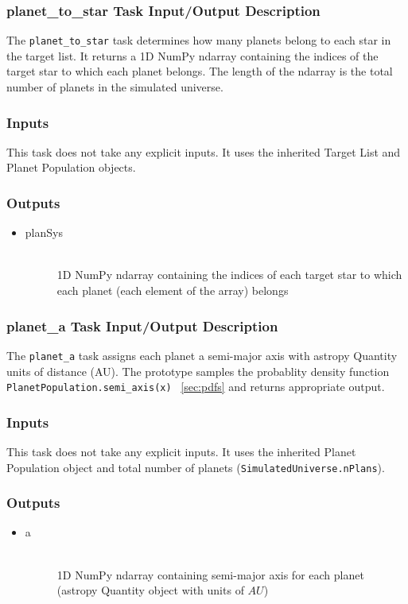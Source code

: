 \documentclass[cleanfoot]{asme2ej}
\begin{document}
\subsubsection{planet\_to\_star Task Input/Output Description} \label{sec:planettostartask}
The \verb+planet_to_star+ task determines how many planets belong to each star in the target list.  It returns a 1D NumPy ndarray containing the indices of the target star to which each planet belongs.  The length of the ndarray is the total number of planets in the simulated universe.

\subsubsection*{Inputs}
This task does not take any explicit inputs.  It uses the inherited Target List and Planet Population objects.

\subsubsection*{Outputs}
\begin{itemize}
    \item 
    \begin{description}
        \item[planSys] \hfill \\
        1D NumPy ndarray containing the indices of each target star to which each planet (each element of the array) belongs
    \end{description}
\end{itemize}

\subsubsection{planet\_a Task Input/Output Description} \label{sec:planetatask}
The \verb+planet_a+ task assigns each planet a semi-major axis with astropy Quantity units of distance (AU).  The prototype samples the probablity density function \verb+PlanetPopulation.semi_axis(x)+ ~\ref{sec:pdfs} and returns appropriate output.

\subsubsection*{Inputs}
This task does not take any explicit inputs.  It uses the inherited Planet Population object and total number of planets (\verb+SimulatedUniverse.nPlans+).

\subsubsection*{Outputs}
\begin{itemize}
    \item 
    \begin{description}
        \item[a] \hfill \\
        1D NumPy ndarray containing semi-major axis for each planet (astropy Quantity object with units of $ AU $)
    \end{description}
\end{itemize}
\end{document}
